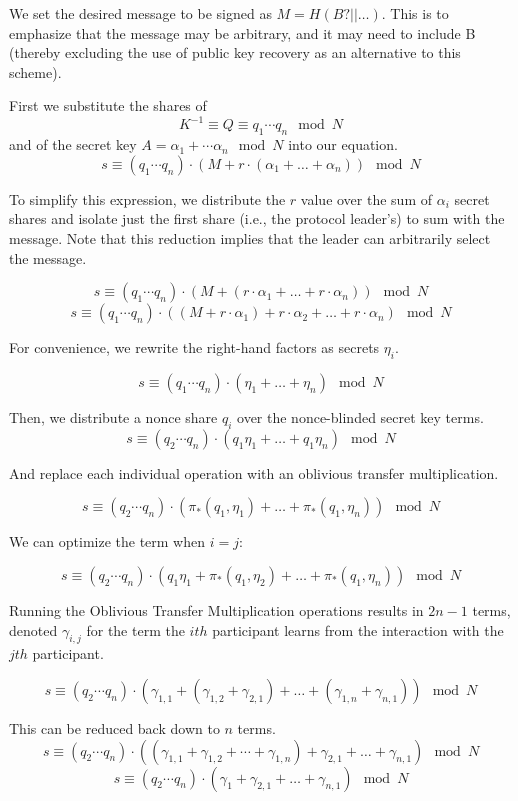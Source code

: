\documentclass{article}
\newcommand{\mulOT}{\pi_{*}}
\begin{document}
We set the desired message to be signed as $M=H(B? || \ldots)$. This is to
emphasize that the message may be arbitrary, and it may need to include B (thereby
excluding the use of public key recovery as an alternative to this scheme).


First we substitute the shares of $$K^{-1} \equiv Q \equiv q_1 \cdots q_n \mod N$$ and of the secret key $A = \alpha_1 + \cdots \alpha_n \mod N$ into our equation. 
$$s \equiv (q_1\cdots q_n)\cdot(M + r\cdot(\alpha_1 + \ldots + \alpha_n)) \mod N$$

To simplify this expression, we distribute the $r$ value over the sum of $\alpha_i$ secret shares and isolate just the first share (i.e., the protocol leader's) to sum with the message. Note that this reduction implies that the leader can arbitrarily select the message.

$$s \equiv (q_1\cdots q_n)\cdot(M + (r \cdot \alpha_1 + \ldots + r \cdot\alpha_n)) \mod N$$
$$s \equiv (q_1\cdots q_n)\cdot((M + r \cdot \alpha_1) + r \cdot \alpha_2 + \ldots + r \cdot\alpha_n) \mod N$$

For convenience, we rewrite the right-hand factors as secrets $\eta_i$.

$$s \equiv (q_1  \cdots q_n)\cdot(\eta_1 + \ldots + \eta_n) \mod N$$


Then, we distribute a nonce share $q_i$ over the nonce-blinded secret key terms.
$$s \equiv (q_2  \cdots q_n)\cdot(q_1\eta_1 + \ldots + q_1\eta_n) \mod N$$


And replace each individual operation with an oblivious transfer multiplication.

$$s \equiv (q_2  \cdots q_n)\cdot(\mulOT(q_1,\eta_1) + \ldots + \mulOT(q_1,\eta_n)) \mod N$$

We can optimize the term when $i=j$:

$$s \equiv (q_2  \cdots q_n)\cdot(q_1\eta_1 + \mulOT(q_1,\eta_2) + \ldots + \mulOT(q_1,\eta_n)) \mod N$$

Running the Oblivious Transfer Multiplication operations results in $2n -1$ terms, denoted $\gamma_{i,j}$ for the term the $ith$ participant learns from the interaction with the $jth$ participant.

$$s \equiv (q_2  \cdots q_n)\cdot(\gamma_{1,1} + (\gamma_{1,2} + \gamma_{2,1}) + \ldots + (\gamma_{1,n} + \gamma_{n,1})) \mod N$$

This can be reduced back down to $n$ terms.
$$s \equiv (q_2  \cdots q_n)\cdot( (\gamma_{1,1} + \gamma_{1,2} + \cdots + \gamma_{1,n}) + \gamma_{2,1} + \ldots + \gamma_{n,1}) \mod N$$
$$s \equiv (q_2  \cdots q_n)\cdot( \gamma_{1} + \gamma_{2,1} + \ldots + \gamma_{n,1}) \mod N$$
\end{document}
